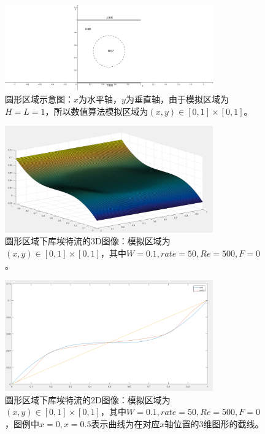 \documentclass[11pt,UTF8]{ctexart}
\begin{document}
    \begin{figure}[h]
        \centerline{\includegraphics[width=0.8\textwidth]{circle.png}}
        \caption{圆形区域示意图：$x$为水平轴，$y$为垂直轴，由于模拟区域为$H=L=1$，所以数值算法模拟区域为$(x,y)\in [0,1]\times [0,1]$。}
        \label{img8}
    \end{figure}
    \begin{figure}[h]
        \centerline{\includegraphics[width=0.8\textwidth]{cutte_W_3D.png}}
        \caption{圆形区域下库埃特流的3D图像：模拟区域为$(x,y)\in [0,1]\times [0,1]$，其中$W=0.1,rate=50,Re=500,F=0$。}
        \label{img9}
    \end{figure}
    \begin{figure}[h]
        \centerline{\includegraphics[width=0.8\textwidth]{cutte_W_2D.png}}
        \caption{圆形区域下库埃特流的2D图像：模拟区域为$(x,y)\in [0,1]\times [0,1]$，其中$W=0.1,rate=50,Re=500,F=0$，图例中$x=0,x=0.5$表示曲线为在对应$x$轴位置的3维图形的截线。}
        \label{img10}
    \end{figure}
\end{document}
